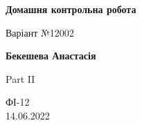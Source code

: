 \documentclass[a4paper,12pt, centered]{article}
\begin{document}
\begin{titlepage}
    \begin{center}
        \vspace*{1cm}
            
        \Huge
        \textbf{Домашня контрольна робота}
            
        \vspace{0.5cm}
        \LARGE
        Варіант №12002
            
        \vspace{1.5cm}
            
        \textbf{Бекешева Анастасія}
            
        \vfill
            
        Part II
            
        \vspace{0.8cm}
            

            
        \Large
        ФІ-12\\14.06.2022
            
    \end{center}
\end{titlepage}
\end{document}
